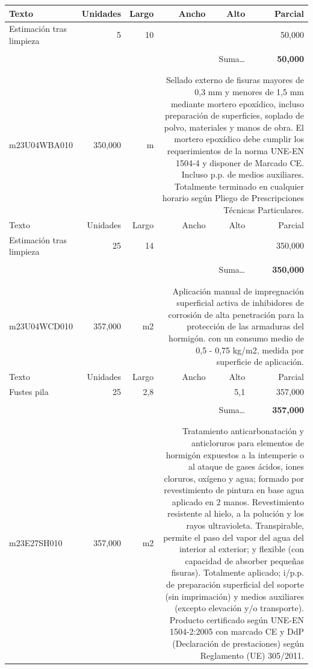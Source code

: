 \documentclass{book}%
\begin{document}
\begin{longtable}{lrrrrr}
Texto&Unidades&Largo&Ancho&Alto&Parcial\\%
\hline%
\multicolumn{1}{p{3.5cm}}{Estimación tras limpieza}&5&10&&&    50,000\\%
&&&&&\\%
\multicolumn{5}{r}{Suma\ldots}&\textbf{    50,000}\\%
\hline%
&&&&&\\%
&&&&&\\%
m23U04WBA010&   350,000& m&\multicolumn{3}{p{6cm}}{\scriptsize Sellado externo de fisuras mayores de 0,3 mm y menores de 1,5 mm mediante mortero epoxídico, incluso preparación de superficies, soplado de polvo, materiales y manos de obra. El mortero epoxídico debe cumplir los requerimientos de la norma UNE-EN 1504-4 y disponer de Marcado CE. Incluso p.p. de medios auxiliares. Totalmente terminado en cualquier horario según Pliego de Prescripciones Técnicas Particulares.\normalsize}\\%
Texto&Unidades&Largo&Ancho&Alto&Parcial\\%
\hline%
\multicolumn{1}{p{3.5cm}}{Estimación tras limpieza}&25&14&&&   350,000\\%
&&&&&\\%
\multicolumn{5}{r}{Suma\ldots}&\textbf{   350,000}\\%
\hline%
&&&&&\\%
&&&&&\\%
m23U04WCD010&   357,000& m2&\multicolumn{3}{p{6cm}}{\scriptsize Aplicación manual de impregnación superficial activa de inhibidores de corrosión de alta penetración para la protección de las armaduras del hormigón. con un consumo medio de 0,5 - 0,75 kg/m2, medida por superficie de aplicación.\normalsize}\\%
Texto&Unidades&Largo&Ancho&Alto&Parcial\\%
\hline%
\multicolumn{1}{p{3.5cm}}{Fustes pila}&25&2,8&&5,1&   357,000\\%
&&&&&\\%
\multicolumn{5}{r}{Suma\ldots}&\textbf{   357,000}\\%
\hline%
&&&&&\\%
&&&&&\\%
m23E27SH010&   357,000& m2&\multicolumn{3}{p{6cm}}{\scriptsize Tratamiento anticarbonatación y anticloruros para elementos de hormigón expuestos a la intemperie o al ataque de gases ácidos, iones cloruros, oxígeno y agua; formado por revestimiento de pintura en base agua aplicado en 2 manos. Revestimiento resistente al hielo, a la polución y los rayos ultravioleta. Transpirable, permite el paso del vapor del agua del interior al exterior; y flexible (con capacidad de absorber pequeñas fisuras). Totalmente aplicado; i/p.p. de preparación superficial del soporte (sin imprimación) y medios auxiliares (excepto elevación y/o transporte). Producto certificado según UNE-EN 1504-2:2005 con marcado CE y DdP (Declaración de prestaciones) según Reglamento (UE) 305/2011.\normalsize}\\%

\end{longtable}
\end{document}

